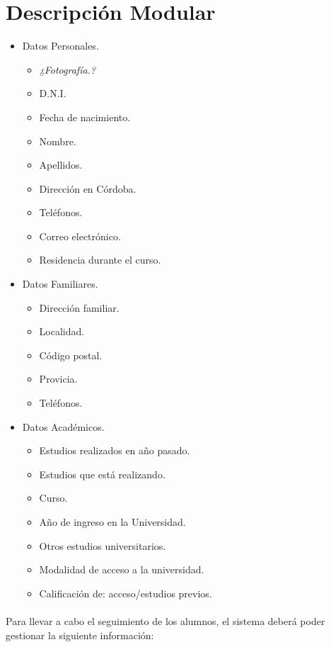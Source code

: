 \section{Descripción Modular}

\begin{itemize}
   \item Datos Personales.
   \begin{itemize}
      \item \textit{¿Fotografía.?}
      \item D.N.I.
      \item Fecha de nacimiento.
      \item Nombre.
      \item Apellidos.
      \item Dirección en Córdoba.
      \item Teléfonos.
      \item Correo electrónico.
      \item Residencia durante el curso.
   \end{itemize}
   \item Datos Familiares.
   \begin{itemize}
      \item Dirección familiar.
      \item Localidad.
      \item Código postal.
      \item Provicia.
      \item Teléfonos.
   \end{itemize}
   \item Datos Académicos.
   \begin{itemize}
      \item Estudios realizados en año pasado.
      \item Estudios que está realizando.
      \item Curso.
      \item Año de ingreso en la Universidad.
      \item Otros estudios universitarios.
      \item Modalidad de acceso a la universidad.
      \item Calificación de: acceso/estudios previos.
   \end{itemize}
\end{itemize}


\paragraph{}Para llevar a cabo el seguimiento de los alumnos, el sistema deberá
poder gestionar la siguiente información:


